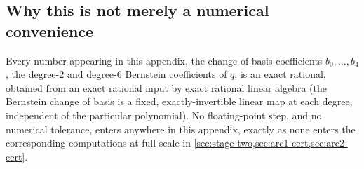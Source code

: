 \documentclass[11pt,reqno]{amsart}
\renewcommand{\_}{\origunderscore\allowbreak}
\numberwithin{equation}{section}
\theoremstyle{plain}
\theoremstyle{definition}
\theoremstyle{remark}
\begin{document}
\subsection{Why this is not merely a numerical convenience}

Every number appearing in this appendix, the change-of-basis
coefficients $b_0,\dots,b_4$, the degree-$2$ and degree-$6$ Bernstein
coefficients of $q$, is an exact rational, obtained from an exact
rational input by exact rational linear algebra (the Bernstein change of
basis is a fixed, exactly-invertible linear map at each degree,
independent of the particular polynomial). No floating-point step, and no
numerical tolerance, enters anywhere in this appendix, exactly as none
enters the corresponding computations at full scale in
\cref{sec:stage-two,sec:arc1-cert,sec:arc2-cert}.
\end{document}
